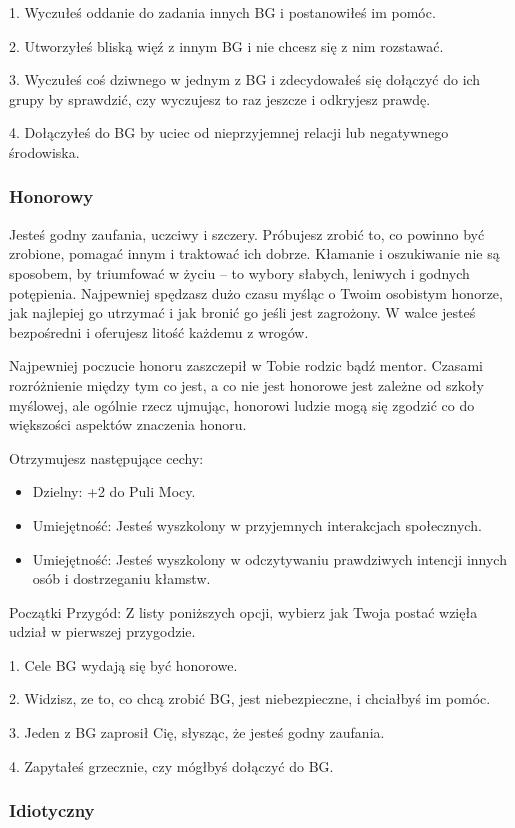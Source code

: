 1. Wyczułeś oddanie do zadania innych BG i postanowiłeś im pomóc.

2. Utworzyłeś bliską więź z innym BG i nie chcesz się z nim rozstawać.

3. Wyczułeś coś dziwnego w jednym z BG i zdecydowałeś się dołączyć do ich grupy by sprawdzić, czy wyczujesz to raz jeszcze i odkryjesz prawdę.

4. Dołączyłeś do BG by uciec od nieprzyjemnej relacji lub negatywnego środowiska. 

\subsubsection{Honorowy}
Jesteś godny zaufania, uczciwy i szczery. Próbujesz zrobić to, co powinno być zrobione, pomagać innym i traktować ich dobrze. Kłamanie i oszukiwanie nie są sposobem, by triumfować w życiu – to wybory słabych, leniwych i godnych potępienia. Najpewniej spędzasz dużo czasu myśląc o Twoim osobistym honorze, jak najlepiej go utrzymać i jak bronić go jeśli jest zagrożony. W walce jesteś bezpośredni i oferujesz litość każdemu z wrogów.

Najpewniej poczucie honoru zaszczepił w Tobie rodzic bądź mentor. Czasami rozróżnienie między tym co jest, a co nie jest honorowe jest zależne od szkoły myślowej, ale ogólnie rzecz ujmując, honorowi ludzie mogą się zgodzić co do większości aspektów znaczenia honoru.

Otrzymujesz następujące cechy:
\begin{itemize}
\item Dzielny: +2 do Puli Mocy.
\item Umiejętność: Jesteś wyszkolony w przyjemnych interakcjach społecznych.
\item Umiejętność: Jesteś wyszkolony w odczytywaniu prawdziwych intencji innych osób i dostrzeganiu kłamstw.
\end{itemize}
    
Początki Przygód: Z listy poniższych opcji, wybierz jak Twoja postać wzięła udział w pierwszej przygodzie.

1. Cele BG wydają się być honorowe.

2. Widzisz, ze to, co chcą zrobić BG, jest niebezpieczne, i chciałbyś im pomóc.

3. Jeden z BG zaprosił Cię, słysząc, że jesteś godny zaufania.

4. Zapytałeś grzecznie, czy mógłbyś dołączyć do BG.

\subsubsection{Idiotyczny}


